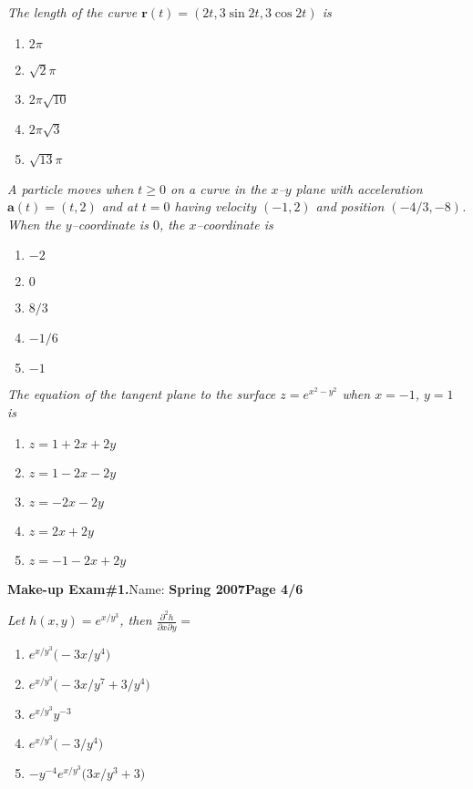 \documentclass[12pt]{article}
\begin{document}
{\problem[10 pts] \em The length of the curve ${\boldsymbol r}(t) =
  (2t, 3\sin 2t, 3 \cos 2t)$ is}
\begin{enumerate}
\item $2\pi$
\item $\sqrt{2}\pi$
\item $2\pi\sqrt{10}$
\item $2\pi\sqrt{3}$
\item $\sqrt{13}\pi$
\end{enumerate}

{\problem[10 pts] \em A particle moves when $t \geq 0$ on a curve in
  the $x$--$y$ plane with acceleration ${\boldsymbol a}(t) = (t,2)$ and
  at $t=0$ having velocity $(-1,2)$ and position $(-4/3, -8)$.  When
  the $y$--coordinate is $0$, the $x$--coordinate is}
\begin{enumerate}
\item $-2$  
\item $0$  
\item $8/3$  
\item $-1/6$  
\item $-1$  
\end{enumerate}


{\problem[10 pts] \em The equation of the tangent plane to the surface
  $z=e^{x^2-y^2}$ when $x=-1$, $y=1$ is}
\begin{enumerate}
\item $z=1+2x+2y$  
\item $z=1-2x-2y$  
\item $z=-2x-2y$  
\item $z=2x+2y$  
\item $z=-1-2x+2y$  
\end{enumerate}
\newpage


\hfill{\bf Make-up Exam\#1.}\hfill Name: \makebox[4cm]{\hrulefill}\hfill{\bf Spring 2007}\hfill{\bf Page 4/6}

\bigskip

{\problem[10 pts] \em Let $h(x,y) = e^{x/y^3}$, then
  $\displaystyle{\frac{\partial^2 h}{\partial x \partial y} = }$}
\begin{enumerate}
\item $e^{x/y^3} \big( -3x/y^4 \big)$
\item $e^{x/y^3} \big( -3x/y^7 + 3/y^4 \big)$
\item $e^{x/y^3} y^{-3}$
\item $e^{x/y^3} \big( -3/y^4 \big)$
\item $-y^{-4} e^{x/y^3} \big( 3x/y^3 + 3 \big)$
\end{enumerate}
\vspace{2cm}
\end{document}
